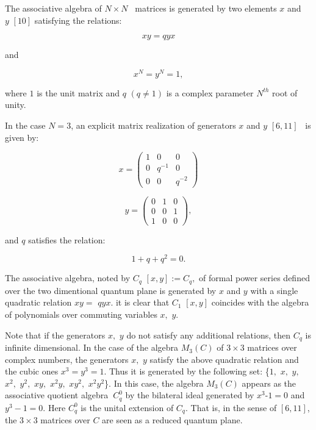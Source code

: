 \documentclass[a4paper,12pt,thmsa]{article}
\begin{document}
The associative algebra of $N\times N$ \ matrices is generated by two
elements $x$ and \ $y$ $[10]$ satisfying the relations:

\begin{equation}
xy=qyx
\end{equation}

and

\begin{equation}
x^N=y^N=1,
\end{equation}

where $1$ is the unit matrix and $q$ $(q\neq 1)$ is a complex parameter $%
N^{th}$ root of unity.

In the case $N=3$, an explicit matrix realization of generators $x$ and $y$ $%
\left[ 6,11\right] $ \ is given by:

\begin{equation}
x=\left(
\begin{array}{ccc}
1 & 0 & 0 \\
0 & q^{-1} & 0 \\
0 & 0 & q^{-2}
\end{array}
\right)
\end{equation}

\begin{equation}
y=\left(
\begin{array}{ccc}
0 & 1 & 0 \\
0 & 0 & 1 \\
1 & 0 & 0
\end{array}
\right) ,
\end{equation}

and $q$ satisfies the relation:

\begin{equation}
1+q+q^{2}=0.
\end{equation}

The associative algebra, noted by $C_q$ $\left[ x,y\right] :=C_q,$ of formal
power series defined over the two dimentional quantum plane is generated by $%
x$ and $y$ with a single quadratic relation $xy=$ $qyx$. it is clear that $%
C_1$ $\left[ x,y\right] $ coincides with the algebra of polynomials over
commuting variables $x,$ $y.$

Note that if the generators $x,$ $y$ do not satisfy any additional
relations, then $C_q$ is infinite dimensional. In the case of the algebra $%
M_3(C)$ of $3\times 3$ matrices over complex numbers, the generators $x,$ $y$
satisfy the above quadratic relation and the cubic ones $x^3=y^3=1$. Thus it
is generated by the following set: \{$1,$ $x,$ $y,$ $x^2,$ $y^2,$ $xy,$ $%
x^2y,$ $xy^2,$ $x^2y^2$\}. In this case, the algebra $M_3(C)$ appears as the
associative quotient algebra $\ C_q^0$ by the bilateral ideal generated by $%
x^3$-$1=0$ and $y^3-1=0$. Here $C_q^0$ is the unital extension of $C_q.$
That is, in the sense of $\left[ 6,11\right] $, the $3\times 3$ matrices
over $C$ are seen as a reduced quantum plane. \
\end{document}
